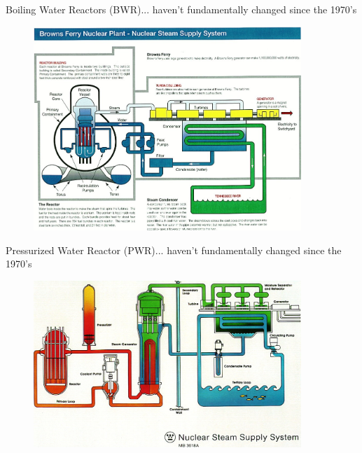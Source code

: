 \documentclass{beamer}
\begin{document}
    \begin{frame}{Boiling Water Reactors (BWR)}{... haven't fundamentally changed since the 1970's}
        \begin{figure}
            \centering
            \includegraphics[width=0.9\textwidth]{./img/bwrBop.png}
            \caption*{}
        \end{figure}
    \end{frame}

    \begin{frame}{Pressurized Water Reactor (PWR)}{... haven't fundamentally changed since the 1970's}
        \begin{figure}
            \centering
            \includegraphics[width=0.9\textwidth]{./img/pwrBop.png}
            \caption*{}
        \end{figure}
    \end{frame}
\end{document}
